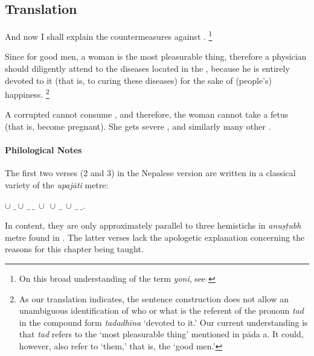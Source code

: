 \subsection*{Translation}
\begin{translation}

\item [1] And now I shall explain the countermeasures against .%
	\footnote{%
	On this broad understanding of the term \emph{yoni}, see \cite[pp.\ 
	572--5]{das-orig}}


\item [2] Since for good men, a woman is the most pleasurable thing, therefore a physician should diligently attend to the diseases located in the , because he is entirely devoted to it (that is, to curing these diseases) for the sake of (people's) happiness.%
	\footnote{%
	As our translation indicates, the sentence construction does not allow an 
	unambiguous identification of who or what is the referent of the pronoun 
	\textit{tad} in the compound form \emph{tadadhīna} ‘devoted to it.’ Our 
	current understanding is that \emph{tad} refers to the ‘most pleasurable thing’ 
	mentioned in pāda a. It could, however, also refer to ‘them,’ that is, the ‘good 
	men.’%
	}

\item [3] A corrupted  cannot consume , and therefore, the woman cannot take a fetus (that is, become pregnant). She gets severe 
\se{arśas}{prolapses}, 
 and similarly many other 
.
\end{translation}

\paragraph*{Philological Notes}
The first two verses (2 and 3) in the Nepalese version are written in a classical variety of the \emph{upajāti} metre: 
	\begin{center}
	 \underline{$\cup$} $\_ \cup\ \_\ \_\ \cup\ \cup\ \_\ \cup\ \_\ \_$.
	\end{center} 
In content, they are only approximately parallel to three hemistichs in \textit{anuṣṭubh} metre found in \cite{vulgate}. The latter verses lack the apologetic explanation concerning the reasons for this chapter being taught.

